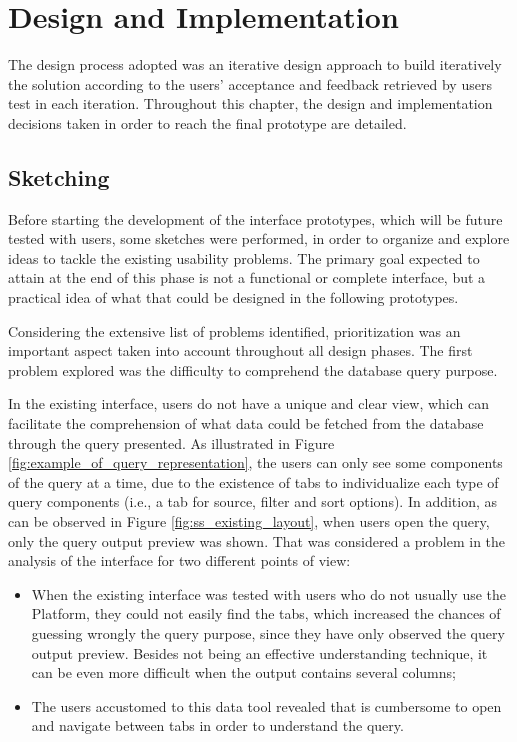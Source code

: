 

\chapter{Design and Implementation}
\label{cha:design_and_implementation}

The design process adopted was an iterative design approach to build iteratively the solution according to the users' acceptance and feedback retrieved by users test in each iteration. Throughout this chapter, the design and implementation decisions taken in order to reach the final prototype are detailed.

\section{Sketching}
\label{sec:sketching}

Before starting the development of the interface prototypes, which will be future tested with users, some sketches were performed, in order to organize and explore ideas to tackle the existing usability problems. The primary goal expected to attain at the end of this phase is not a functional or complete interface, but a practical idea of what that could be designed in the following prototypes.

Considering the extensive list of problems identified, prioritization was an important aspect taken into account throughout all design phases. The first problem explored was the difficulty to comprehend the database query purpose.

In the existing interface, users do not have a unique and clear view, which can facilitate the comprehension of what data could be fetched from the database through the query presented. As illustrated in Figure \ref{fig:example_of_query_representation}, the users can only see some components of the query at a time, due to the existence of tabs to individualize each type of query components (i.e., a tab for source, filter and sort options). In addition, as can be observed in Figure \ref{fig:ss_existing_layout}, when users open the query, only the query output preview was shown. That was considered a problem in the analysis of the interface for two different points of view:

\begin{itemize}
    \item When the existing interface was tested with users who do not usually use the Platform, they could not easily find the tabs, which increased the chances of guessing wrongly the query purpose, since they have only observed the query output preview. Besides not being an effective understanding technique, it can be even more difficult when the output contains several columns;
    \item The users accustomed to this data tool revealed that is cumbersome to open and navigate between tabs in order to understand the query.
\end{itemize}

